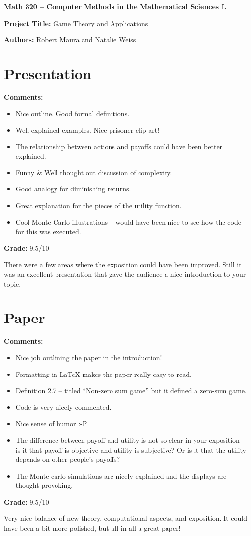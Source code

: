 \documentclass[12pt]{article}
\begin{document}
{\bf \large Math 320 -- Computer Methods in the Mathematical Sciences I.}\\

\vspace{3mm}

{\bf \large Project Title:} Game Theory and Applications\\
\vspace{2mm}

{\bf \large Authors:} Robert Maura and Natalie Weiss\\

\vspace{3mm}

\section{Presentation}
{\bf \large Comments:}
\begin{itemize}
\item Nice outline. Good formal definitions.
\item Well-explained examples. Nice prisoner clip art!
\item The relationship between actions and payoffs could have been
better explained.
\item Funny \& Well thought out discussion of complexity.
\item Good analogy for diminishing returns.
\item Great explanation for the pieces of the utility function.
\item Cool Monte Carlo illustrations -- would have been nice to see
how the code for this was executed.
\end{itemize}

{\bf \large Grade:} 9.5/10

There were a few areas where the exposition could have been improved.
Still it was an excellent presentation that gave the audience a nice
introduction to your topic.

\section{Paper}

{\bf \large Comments:}
\begin{itemize}
\item Nice job outlining the paper in the introduction!
\item Formatting in LaTeX makes the paper really easy to read.
\item Definition 2.7 -- titled ``Non-zero sum game'' but it defined a zero-sum game.
\item Code is very nicely commented.
\item Nice sense of humor :-P
\item The difference between payoff and utility is not so clear in your
exposition -- is it that payoff is objective and utility is subjective?
Or is it that the utility depends on other people's payoffs?
\item The Monte carlo simulations are nicely explained and the displays are
thought-provoking.
\end{itemize}

{\bf \large Grade:} 9.5/10

Very nice balance of new theory, computational aspects, and 
exposition. It could have been a bit more polished, but all in all
a great paper!
\end{document}
